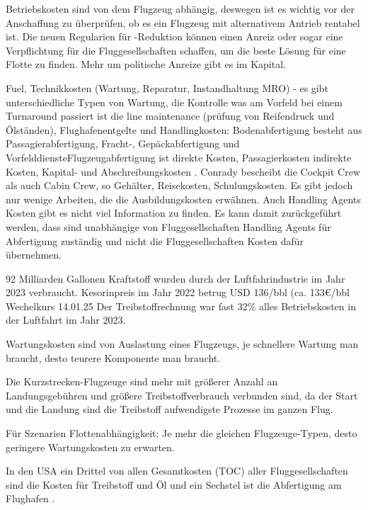Betriebskosten sind von dem Flugzeug abhängig, deswegen ist es wichtig vor der Anschaffung zu überprüfen, 
ob es ein Flugzeug mit alternativem Antrieb rentabel ist. Die neuen Regularien für -Reduktion können einen Anreiz oder sogar 
eine Verpflichtung für die Fluggesellschaften schaffen, um die beste Lösung für eine Flotte zu finden. Mehr um politische Anreize gibt es im Kapital.

Fuel, Technikkosten (Wartung, Reparatur, Instandhaltung MRO) - es gibt unterschiedliche Typen von Wartung, die Kontrolle was am Vorfeld bei einem 
Turnaround passiert ist die line maintenance (prüfung von Reifendruck und Ölständen), Flughafenentgelte und Handlingkosten: 
Bodenabfertigung besteht aus Passagierabfertigung, Fracht-, Gepäckabfertigung und VorfelddiensteFlugzeugabfertigung ist direkte Kosten, 
Passagierkosten indirekte Kosten, Kapital- und Abschreibungskosten \cite{conrady2019luftverkehr}. 
Conrady bescheibt die Cockpit Crew als auch Cabin Crew, so Gehälter, Reisekosten, Schulungskosten. Es gibt jedoch nur wenige Arbeiten, 
die die Ausbildungskosten erwähnen. Auch Handling Agents Kosten gibt es nicht viel Information zu finden. Es kann damit zurückgeführt werden, dass
sind unabhängige von Fluggesellschaften Handling Agents für Abfertigung zuständig und nicht die Fluggesellschaften Kosten dafür übernehmen.

92 Milliarden Gallonen Kraftstoff wurden durch der Luftfahrindustrie im Jahr 2023 verbraucht.\cite{iata_industry_statistics_2024}
Kesorinpreis im Jahr 2022 betrug USD 136/bbl (ca. 133€/bbl Wechelkurs 14.01.25 \cite{ecb_exchange_rates_usd}
Der Treibstoffrechnung war fast 32\% alles Betriebskosten in der Luftfahrt im Jahr 2023. \cite{iata_industry_statistics_2024}

Wartungskosten sind von Auslastung eines Flugzeugs, je schnellere Wartung man braucht, desto teurere Komponente man braucht.

Die Kurzstrecken-Flugzeuge sind mehr mit größerer Anzahl an Landungsgebühren und größere Treibstoffverbrauch verbunden sind, da 
der Start und die Landung sind die Treibstoff aufwendigste Prozesse im ganzen Flug.

Für Szenarien Flottenabhängigkeit: Je mehr die gleichen Flugzeuge-Typen, desto geringere Wartungskosten zu erwarten.


In den USA ein Drittel von allen Gesamtkosten (TOC) aller Fluggesellschaften sind die Kosten für Treibstoff und Öl 
und ein Sechstel ist die Abfertigung am Flughafen \cite{conrady2019luftverkehr}. 

